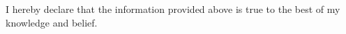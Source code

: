 I hereby declare that the information provided above is true to the best of my knowledge and belief.
